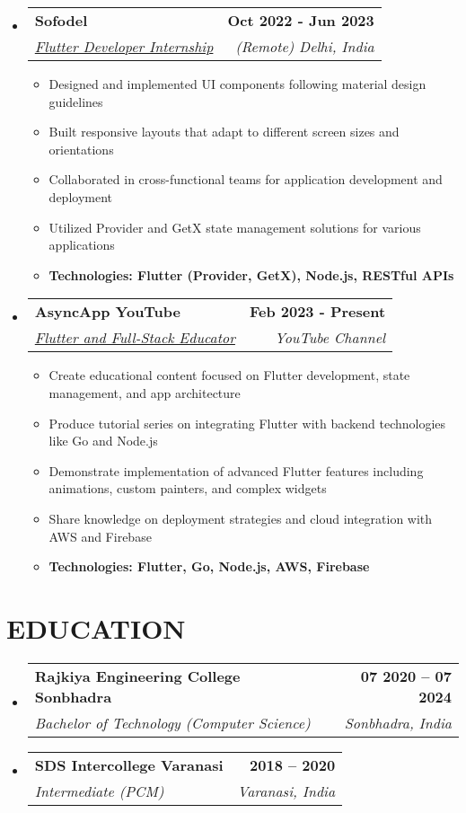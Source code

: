 \documentclass[letterpaper,11pt]{article}
\makeatletter
\newcommand{\resumeItem}[1]{
  \item\small{
    {#1 \vspace{-2pt}}
  }
}
\newcommand{\resumeSubheading}[4]{
  \vspace{-2pt}\item
    \begin{tabular*}{1.0\textwidth}[t]{l@{\extracolsep{\fill}}r}
      \textbf{\large#1} & \textbf{\small #2} \\
      \textit{\large#3} & \textit{\small #4} \\
      
    \end{tabular*}\vspace{-7pt}
}
\newcommand{\resumeSubHeadingListStart}{\begin{itemize}[leftmargin=0.0in, label={}]}
\newcommand{\resumeSubHeadingListEnd}{\end{itemize}}
\newcommand{\resumeItemListStart}{\begin{itemize}}
\newcommand{\resumeItemListEnd}{\end{itemize}\vspace{-5pt}}
\makeatother
\begin{document}
   \resumeSubHeadingListStart
    \resumeSubheading
      {Sofodel \href{https://www.sofodel.com/}{\raisebox{-0.1\height}\faLink }}{Oct 2022 - Jun 2023} 
      {\underline{Flutter Developer Internship}}{(Remote) Delhi, India}
      \resumeItemListStart
        \resumeItem{\normalsize{Designed and implemented UI components following material design guidelines}}
        \resumeItem{\normalsize{Built responsive layouts that adapt to different screen sizes and orientations}}
        \resumeItem{\normalsize{Collaborated in cross-functional teams for application development and deployment}}
        \resumeItem{\normalsize{Utilized Provider and GetX state management solutions for various applications}}
        \resumeItem{\normalsize{\textbf{Technologies: Flutter (Provider, GetX), Node.js, RESTful APIs}}}
      \resumeItemListEnd  
  \resumeSubHeadingListEnd

   \resumeSubHeadingListStart
    \resumeSubheading
      {AsyncApp YouTube \href{https://www.youtube.com/@asyncapp}{\raisebox{-0.1\height}\faLink }}{ Feb 2023 - Present} 
      {\underline{Flutter and Full-Stack Educator}}{YouTube Channel}
      \resumeItemListStart
        \resumeItem{\normalsize{Create educational content focused on Flutter development, state management, and app architecture}}
        \resumeItem{\normalsize{Produce tutorial series on integrating Flutter with backend technologies like Go and Node.js}}
        \resumeItem{\normalsize{Demonstrate implementation of advanced Flutter features including animations, custom painters, and complex widgets}}
        \resumeItem{\normalsize{Share knowledge on deployment strategies and cloud integration with AWS and Firebase}}
        \resumeItem{\normalsize{\textbf{Technologies: Flutter, Go, Node.js, AWS, Firebase}}}
      \resumeItemListEnd  
  \resumeSubHeadingListEnd
\vspace{-12pt}

\section{EDUCATION}
  \resumeSubHeadingListStart
    \resumeSubheading
      {Rajkiya Engineering College Sonbhadra}{07 2020 -- 07 2024}
      {Bachelor of Technology (Computer Science)}{Sonbhadra, India}
  \resumeSubHeadingListEnd
  
  \resumeSubHeadingListStart
    \resumeSubheading
      {SDS Intercollege Varanasi}{2018 -- 2020}
      {Intermediate (PCM)}{Varanasi, India}
  \resumeSubHeadingListEnd
\end{document}
